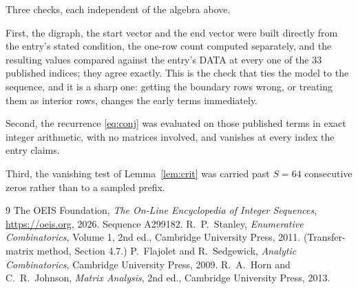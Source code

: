 \documentclass[11pt,a4paper]{article}
\theoremstyle{plain}
\theoremstyle{definition}
\begin{document}
Three checks, each independent of the algebra above.

First, the digraph, the start vector and the end vector were built directly from the
entry's stated condition, the one-row count computed separately, and the resulting values
compared against the entry's DATA at every one of the $33$ published indices; they
agree exactly. This is the check that ties the model to the sequence, and it is a sharp one:
getting the boundary rows wrong, or treating them as interior rows, changes the early terms
immediately.

Second, the recurrence \eqref{eq:conj} was evaluated on those published terms in exact
integer arithmetic, with no matrices involved, and vanishes at every index the entry claims.

Third, the vanishing test of Lemma~\ref{lem:crit} was carried past $S=64$ consecutive
zeros rather than to a sampled prefix.

\begin{thebibliography}{9}
 The OEIS Foundation, \emph{The On-Line Encyclopedia of Integer
Sequences}, \url{https://oeis.org}, 2026. Sequence A299182.
 R.~P.~Stanley, \emph{Enumerative Combinatorics}, Volume 1, 2nd ed.,
Cambridge University Press, 2011. (Transfer-matrix method, Section 4.7.)
 P.~Flajolet and R.~Sedgewick, \emph{Analytic Combinatorics}, Cambridge
University Press, 2009.
 R.~A.~Horn and C.~R.~Johnson, \emph{Matrix Analysis}, 2nd ed., Cambridge
University Press, 2013.
\end{thebibliography}
\end{document}
